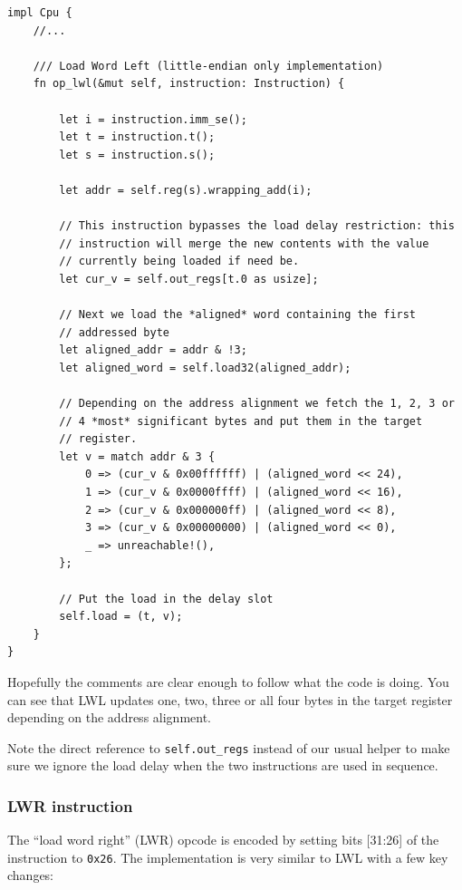 \documentclass[a4paper]{article}
\newcommand{\code}[1] {\texttt{#1}}
\begin{document}
\begin{lstlisting}
impl Cpu {
    //...

    /// Load Word Left (little-endian only implementation)
    fn op_lwl(&mut self, instruction: Instruction) {

        let i = instruction.imm_se();
        let t = instruction.t();
        let s = instruction.s();

        let addr = self.reg(s).wrapping_add(i);

        // This instruction bypasses the load delay restriction: this
        // instruction will merge the new contents with the value
        // currently being loaded if need be.
        let cur_v = self.out_regs[t.0 as usize];

        // Next we load the *aligned* word containing the first
        // addressed byte
        let aligned_addr = addr & !3;
        let aligned_word = self.load32(aligned_addr);

        // Depending on the address alignment we fetch the 1, 2, 3 or
        // 4 *most* significant bytes and put them in the target
        // register.
        let v = match addr & 3 {
            0 => (cur_v & 0x00ffffff) | (aligned_word << 24),
            1 => (cur_v & 0x0000ffff) | (aligned_word << 16),
            2 => (cur_v & 0x000000ff) | (aligned_word << 8),
            3 => (cur_v & 0x00000000) | (aligned_word << 0),
            _ => unreachable!(),
        };

        // Put the load in the delay slot
        self.load = (t, v);
    }
}
\end{lstlisting}

Hopefully the comments are clear enough to follow what the code is
doing. You can see that LWL updates one, two, three or all four bytes
in the target register depending on the address alignment.

Note the direct reference to \code{self.out\_regs} instead of our usual
helper to make sure we ignore the load delay when the two instructions
are used in sequence.

\subsubsection{LWR instruction}

The ``load word right'' (LWR) opcode is encoded by setting bits
[31:26] of the instruction to \code{0x26}. The implementation is very
similar to LWL with a few key changes:
\end{document}
